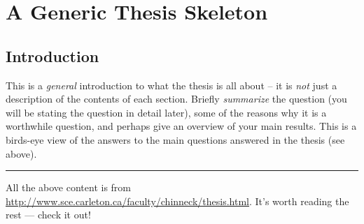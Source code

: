 %
%
%
%
%

\chapter{A Generic Thesis Skeleton}\label{chap:thesis-skeleton}


\section{Introduction}
This is a \emph{general} introduction to what the thesis is all about -- it is \emph{not} just a description of the contents of each section. Briefly \emph{summarize} the question (you will be stating the question in detail later), some of the reasons why it is a worthwhile question, and perhaps give an overview of your main results. This is a birds-eye view of the answers to the main questions answered in the thesis (see above).
\vspace{5mm}
\hrule
\vspace{5mm}

All the above content is from \url{http://www.sce.carleton.ca/faculty/chinneck/thesis.html}. It's worth reading the rest --- check it out!


